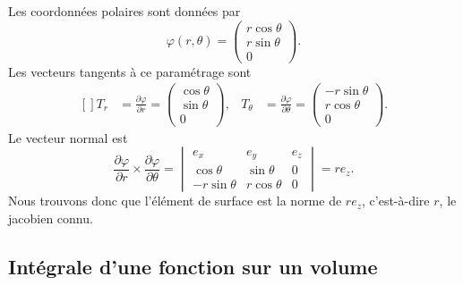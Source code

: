 \begin{example}
	Les coordonnées polaires sont données par
	\begin{equation}
		\varphi(r,\theta)=\begin{pmatrix}
			r\cos\theta \\
			r\sin\theta \\
			0
		\end{pmatrix}.
	\end{equation}
	Les vecteurs tangents à ce paramétrage sont
	\begin{equation}
		\begin{aligned}[]
			T_r & =\frac{ \partial \varphi }{ \partial r }=\begin{pmatrix}
				\cos\theta \\
				\sin\theta \\
				0
			\end{pmatrix}, & T_{\theta} & =\frac{ \partial \varphi }{ \partial \theta }=\begin{pmatrix}
				-r\sin\theta \\
				r\cos\theta  \\
				0
			\end{pmatrix}.
		\end{aligned}
	\end{equation}
	Le vecteur normal est
	\begin{equation}
		\frac{ \partial \varphi }{ \partial r }\times\frac{ \partial \varphi }{ \partial \theta }=\begin{vmatrix}
			e_x          & e_y         & e_z \\
			\cos\theta   & \sin\theta  & 0   \\
			-r\sin\theta & r\cos\theta & 0
		\end{vmatrix}=re_z.
	\end{equation}
	Nous trouvons donc que l'élément de surface est la norme de $re_z$, c'est-à-dire $r$, le jacobien connu.
\end{example}

\subsection{Intégrale d'une fonction sur un volume}

